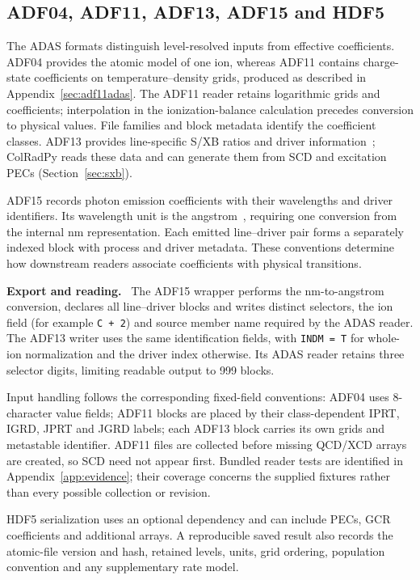 \documentclass[11pt,a4paper]{article}
\newenvironment{implnote}[1][Implementation]{%
  \par\smallskip\noindent\begin{lrbox}{\notebox}\setlength{\fboxsep}{6pt}\begin{minipage}{\dimexpr\linewidth-2\fboxsep-2\fboxrule\relax}\small\textbf{#1.}\ }{%
  \end{minipage}\end{lrbox}\setlength{\fboxsep}{6pt}\fcolorbox{noteframe}{notebg}{\usebox{\notebox}}\par\smallskip}
\numberwithin{equation}{section}
\begin{document}
\subsection{ADF04, ADF11, ADF13, ADF15 and HDF5}

The ADAS formats distinguish level-resolved inputs from effective
coefficients. ADF04 provides the atomic model of one ion, whereas
ADF11 contains charge-state coefficients on temperature--density
grids, produced as described in Appendix~\ref{sec:adf11adas}.
The ADF11 reader retains logarithmic grids and coefficients;
interpolation in the ionization-balance calculation precedes
conversion to physical values. File families and block metadata
identify the coefficient classes. ADF13 provides line-specific
S/XB ratios and driver information~\cite{adf13}; ColRadPy reads
these data and can generate them from SCD and excitation PECs
(Section~\ref{sec:sxb}).

ADF15 records photon emission coefficients with their wavelengths
and driver identifiers. Its wavelength unit is the angstrom~\cite{adf15},
requiring one conversion from the internal nm representation.
Each emitted line--driver pair forms a separately indexed block
with process and driver metadata. These conventions determine how
downstream readers associate coefficients with physical transitions.

\begin{implnote}[Export and reading]
The ADF15 wrapper performs the nm-to-angstrom conversion, declares
all line--driver blocks and writes distinct selectors, the ion field
(for example \texttt{C + 2}) and source member name required by the
ADAS reader. The ADF13 writer uses the same identification fields,
with \texttt{INDM = T} for whole-ion normalization and the driver
index otherwise. Its ADAS reader retains three selector digits,
limiting readable output to 999 blocks.

Input handling follows the corresponding fixed-field conventions:
ADF04 uses 8-character value fields; ADF11 blocks are placed by
their class-dependent IPRT, IGRD, JPRT and JGRD labels; each ADF13
block carries its own grids and metastable identifier. ADF11 files
are collected before missing QCD/XCD arrays are created, so SCD
need not appear first. Bundled reader tests are identified in
Appendix~\ref{app:evidence}; their coverage concerns the supplied
fixtures rather than every possible collection or revision.
\end{implnote}

HDF5 serialization uses an optional dependency and can include PECs,
GCR coefficients and additional arrays. A reproducible saved result
also records the atomic-file version and hash, retained levels,
units, grid ordering, population convention and any supplementary
rate model.
\end{document}
